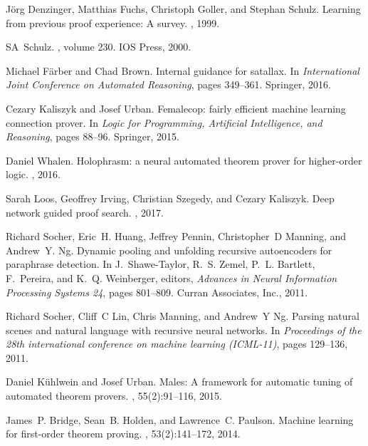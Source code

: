 \documentclass{article}
\begin{document}
\begin{thebibliography}{10}
J{\"o}rg Denzinger, Matthias Fuchs, Christoph Goller, and Stephan Schulz.
\newblock Learning from previous proof experience: A survey.
, 1999.

SA~Schulz.
,
  volume 230.
\newblock IOS Press, 2000.

Michael F{\"a}rber and Chad Brown.
\newblock Internal guidance for satallax.
\newblock In {\em International Joint Conference on Automated Reasoning}, pages
  349--361. Springer, 2016.

Cezary Kaliszyk and Josef Urban.
\newblock Femalecop: fairly efficient machine learning connection prover.
\newblock In {\em Logic for Programming, Artificial Intelligence, and
  Reasoning}, pages 88--96. Springer, 2015.

Daniel Whalen.
\newblock Holophrasm: a neural automated theorem prover for higher-order logic.
, 2016.

Sarah Loos, Geoffrey Irving, Christian Szegedy, and Cezary Kaliszyk.
\newblock Deep network guided proof search.
, 2017.

Richard Socher, Eric~H. Huang, Jeffrey Pennin, Christopher~D Manning, and
  Andrew~Y. Ng.
\newblock Dynamic pooling and unfolding recursive autoencoders for paraphrase
  detection.
\newblock In J.~Shawe-Taylor, R.~S. Zemel, P.~L. Bartlett, F.~Pereira, and
  K.~Q. Weinberger, editors, {\em Advances in Neural Information Processing
  Systems 24}, pages 801--809. Curran Associates, Inc., 2011.

Richard Socher, Cliff~C Lin, Chris Manning, and Andrew~Y Ng.
\newblock Parsing natural scenes and natural language with recursive neural
  networks.
\newblock In {\em Proceedings of the 28th international conference on machine
  learning (ICML-11)}, pages 129--136, 2011.

Daniel K{\"u}hlwein and Josef Urban.
\newblock Males: A framework for automatic tuning of automated theorem provers.
, 55(2):91--116, 2015.

James~P. Bridge, Sean~B. Holden, and Lawrence~C. Paulson.
\newblock Machine learning for first-order theorem proving.
, 53(2):141--172, 2014.


\end{thebibliography}
\end{document}
